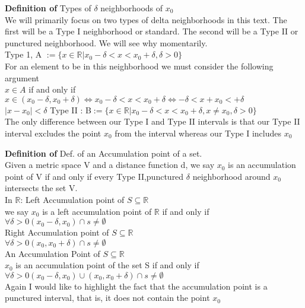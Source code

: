 \documentclass[12pt]{article}
\theoremstyle{definition}
\newenvironment{definition}{\vspace{1em}\noindent\textbf{Definition of}}{\vspace{1em}}
\begin{document}
\begin{definition}
Types of $\delta$ neighborhoods of $x_0$\\
We will primarily focus on two types of delta neighborhoods in this text. The first will be a Type I neighborhood or standard. The second will be a Type II or punctured neighborhood. We will see why momentarily.\\
Type 1, A $:= \{x \in \mathbb{R} | x_0 - \delta < x < x_0 + \delta , \delta > 0\}$\\
For an element to be in this neighborhood we must consider the following argument\\
$x \in A $ if and only if $x \in (x_0 - \delta, x_0 +\delta) \iff x_0 - \delta < x < x_0 + \delta \iff -\delta < x + x_0 < +\delta $\\
$\mid x - x_0 \mid < \delta$
\newpage
Type II : B$:= \{x \in \mathbb{R} | x_0 - \delta < x < x_0 + \delta , x \ne x_0 ,\delta > 0\}$\\
The only difference between our Type I and Type II intervals is that our Type II interval excludes the point $x_0$ from the interval whereas our Type I includes $x_0$\\
\end{definition}

\begin{definition}
Def. of an Accumulation point of a set.\\
Given a metric space V and a distance function d, we say $x_0$ is an accumulation point of V if and only if every Type II,punctured $\delta$ neighborhood around $x_0$ intersects the set V.\\
In $\mathbb{R}$: Left Accumulation point of $S \subseteq \mathbb{R}$\\
we say $x_0$ is a left accumulation point of $\mathbb{R}$ if and only if\\
$ \forall \delta > 0 (x_0 - \delta, x_0) \cap s \ne \emptyset $\\
Right Accumulation point of $S \subseteq \mathbb{R}$\\
$ \forall \delta > 0 (x_0, x_0 + \delta) \cap s \ne \emptyset $\\
An Accumulation Point of $S \subseteq \mathbb{R}$\\
$x_0$ is an accumulation point of the set S if and only if\\
$ \forall \delta > 0 (x_0 - \delta, x_0) \cup (x_0, x_0 + \delta) \cap s \ne \emptyset $\\
Again I would like to highlight the fact that the accumulation point is a punctured interval, that is, it does not contain the point $x_0$\\

\end{definition}
\end{document}
